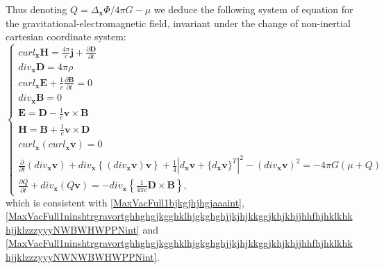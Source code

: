 \documentclass{article}
\theoremstyle{definition}
\theoremstyle{remark}
\renewcommand{\vec}[1]{\mathbf{#1}}
\newcommand{\er}{\eqref}
\newcommand{\er}{\eqref}
\begin{document}
Thus denoting $Q=\Delta_{\vec x}\Phi/4\pi G-\mu$ we deduce the
following system of equation for the gravitational-electromagnetic
field, invariant under the change of non-inertial cartesian
coordinate system:
\begin{equation}\label{guigjgjffghguygjyfghggDDint}
\begin{cases}
curl_{\vec x}\vec H=\frac{4\pi}{c}\vec j+\frac{\partial\vec
D}{\partial
t}\\
div_{\vec x}\vec D=4\pi\rho\\
curl_{\vec x}\vec E+\frac{1}{c}\frac{\partial\vec B}{\partial t}=0\\
div_{\vec x}\vec B=0\\
\vec E=\vec D-\frac{1}{c}\vec v\times\vec B\\
\vec H=\vec B+\frac{1}{c}\vec v\times\vec D\\
curl_{\vec x}\left(curl_{\vec x}\vec v\right)=0
\\
\frac{\partial}{\partial t}\left(div_{\vec x}\vec v\right)+div_{\vec
x}\left\{\left(div_{\vec x}\vec v\right)\vec
v\right\}+\frac{1}{4}\left|d_{\vec x}\vec v+\{d_{\vec x}\vec
v\}^T\right|^2-\left(div_{\vec x}\vec v\right)^2=  -4\pi G(\mu+Q)
\\
\frac{\partial Q}{\partial t}+div_{\vec x}\left(Q\vec
v\right)=-div_{\vec x}\left\{\frac{1}{4\pi c}\vec D\times\vec
B\right\},
\end{cases}
\end{equation}
which is consistent with \er{MaxVacFull1bjkgjhjhgjaaaint},
\er{MaxVacFull1ninshtrgravortghhghgjkgghklhjgkghghjjkjhjkkggjkhjkhjjhhfhjhklkhkhjjklzzzyyyNWBWHWPPNint}
and
\er{MaxVacFull1ninshtrgravortghhghgjkgghklhjgkghghjjkjhjkkggjkhjkhjjhhfhjhklkhkhjjklzzzyyyNWNWBWHWPPNint}.
\end{document}
